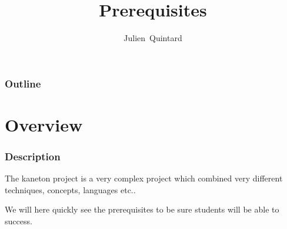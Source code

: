 %
%
%
%
%
%

%
%

\def\path{../..}

%
%



%
%

\title{Prerequisites}

%
%

\author
{
  Julien~Quintard
}

%
%



%
%

\begin{frame}
  \titlepage

  \begin{center}
    \logos
  \end{center}
\end{frame}

%
%

\begin{frame}
  \frametitle{Outline}
  \tableofcontents
\end{frame}

%
%

\section{Overview}


\begin{frame}
  \frametitle{Description}

  The kaneton project is a very complex project which combined very different
  techniques, concepts, languages etc..

  \nl

  We will here quickly see the prerequisites to be sure students will be
  able to success.
\end{frame}



